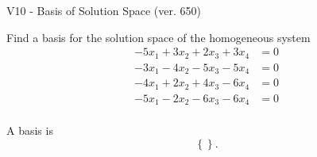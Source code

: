 \begin{exercise}
  \begin{exerciseTitle}V10 - Basis of Solution Space (ver. 650)\end{exerciseTitle}
  \begin{exerciseStatement}
    Find a basis for the solution space of the homogeneous system 
\begin{align*}
 -5 x_ 1 + 3 x_ 2 + 2 x_ 3 + 3 x_ 4 &= 0  \\ 
  -3 x_ 1 -4 x_ 2 -5 x_ 3 -5 x_ 4 &= 0  \\ 
  -4 x_ 1 + 2 x_ 2 + 4 x_ 3 -6 x_ 4 &= 0  \\ 
  -5 x_ 1 -2 x_ 2 -6 x_ 3 -6 x_ 4 &= 0  \\ 
 \end{align*}


 
  \end{exerciseStatement}

  \begin{exerciseAnswer}
   A basis is   
\[\left\{\right\}.\]

  


  \end{exerciseAnswer}
\end{exercise}